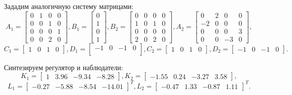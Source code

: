 Зададим аналогичную систему матрицами:
\begin{equation*}
    A_1 = \begin{bmatrix}
        0 & 1 & 0 & 0 \\
        0 & 0 & 1 & 0 \\
        0 & 0 & 0 & 1 \\
        0 & 0 & 2 & 0
    \end{bmatrix}, 
    B_1 = \begin{bmatrix}
        0 \\ 1 \\ 0 \\ 1
    \end{bmatrix},
    B_2 = \begin{bmatrix}
        0 & 0 & 0 & 0 \\
        1 & 0 & 1 & 0 \\
        0 & 0 & 0 & 0 \\
        2 & 0 & 2 & 0
    \end{bmatrix}, 
    A_2 = \begin{bmatrix}
        0 & 2 & 0 & 0 \\
        -2 & 0 & 0 & 0 \\
        0 & 0 & 0 & 3 \\
        0 & 0 & -3 & 0
    \end{bmatrix}, 
\end{equation*}
\begin{equation*}
    C_1 = \begin{bmatrix}
        1 & 0 & 1 & 0
    \end{bmatrix},
    D_1 = \begin{bmatrix}
        -1 & 0 & -1 & 0 \\
    \end{bmatrix},
    C_2 = \begin{bmatrix}
        1 & 0 & 1 & 0
    \end{bmatrix},
    D_2 = \begin{bmatrix}
        -1 & 0 & -1 & 0
    \end{bmatrix}.
\end{equation*}

Синтезируем регулятор и наблюдатели:
\begin{equation*}
    K_1 = \begin{bmatrix}
        1 & 3.96 & -9.34 & -8.28
    \end{bmatrix},
    K_2 = \begin{bmatrix}
        -1.55 & 0.24 & -3.27 & 3.58
    \end{bmatrix},
\end{equation*}
\begin{equation*}
    L_1 = \begin{bmatrix}
        -0.27 & -5.88 & -8.54 & -14.01
    \end{bmatrix}^T,
    L_2 = \begin{bmatrix}
        -0.47 & 1.33 & -0.87 & 1.11
    \end{bmatrix}^T.
\end{equation*}

